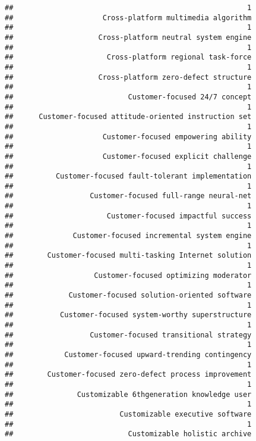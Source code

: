 \documentclass[
]{article}
\begin{document}
\begin{verbatim}
##                                                       1 
##                     Cross-platform multimedia algorithm 
##                                                       1 
##                    Cross-platform neutral system engine 
##                                                       1 
##                      Cross-platform regional task-force 
##                                                       1 
##                    Cross-platform zero-defect structure 
##                                                       1 
##                           Customer-focused 24/7 concept 
##                                                       1 
##      Customer-focused attitude-oriented instruction set 
##                                                       1 
##                     Customer-focused empowering ability 
##                                                       1 
##                     Customer-focused explicit challenge 
##                                                       1 
##          Customer-focused fault-tolerant implementation 
##                                                       1 
##                  Customer-focused full-range neural-net 
##                                                       1 
##                      Customer-focused impactful success 
##                                                       1 
##              Customer-focused incremental system engine 
##                                                       1 
##        Customer-focused multi-tasking Internet solution 
##                                                       1 
##                   Customer-focused optimizing moderator 
##                                                       1 
##             Customer-focused solution-oriented software 
##                                                       1 
##           Customer-focused system-worthy superstructure 
##                                                       1 
##                  Customer-focused transitional strategy 
##                                                       1 
##            Customer-focused upward-trending contingency 
##                                                       1 
##        Customer-focused zero-defect process improvement 
##                                                       1 
##               Customizable 6thgeneration knowledge user 
##                                                       1 
##                         Customizable executive software 
##                                                       1 
##                           Customizable holistic archive 

\end{verbatim}
\end{document}
